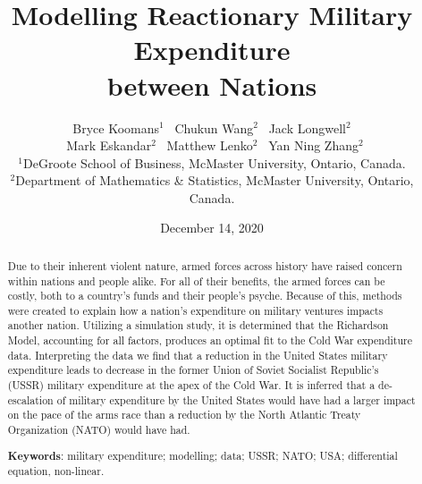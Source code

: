 \documentclass[12pt, centerh1]{article}
\title{Modelling Reactionary Military Expenditure \\between Nations}
\author{\qquad Bryce Koomans$^{1}$ \qquad\  Chukun Wang$^{2}$ \qquad\  Jack Longwell$^{2}$ \\ 
        \qquad\ Mark Eskandar$^{2}$ \qquad\ Matthew Lenko$^{2}$ \qquad\  Yan Ning Zhang$^{2}$ \\
\small $^1$DeGroote School of Business, McMaster University, Ontario, Canada.\\[-6pt]
\small $^2$Department of Mathematics \& Statistics, McMaster University, Ontario, Canada.\\[-6pt] 
}
\date{{\small December 14, 2020}}
\begin{document}
\maketitle
\begin{abstract}

Due to their inherent violent nature, armed forces across history have raised concern within nations and people alike. For all of their benefits, the armed forces can be costly, both to a country's funds and their people's psyche. Because of this, methods were created to explain how a nation's expenditure on military ventures impacts another nation. Utilizing a simulation study, it is determined that the Richardson Model, accounting for all factors, produces an optimal fit to the Cold War expenditure data. Interpreting the data we find that a reduction in the United States military expenditure leads to decrease in the former Union of Soviet Socialist Republic's (USSR) military expenditure at the apex of the Cold War. It is inferred that a de-escalation of military expenditure by the United States would have had a larger impact on the pace of the arms race than a reduction by the North Atlantic Treaty Organization (NATO) would have had. 

\vspace{3mm}

\noindent\textbf{Keywords}: military expenditure; modelling; data; USSR; NATO; USA; differential equation, non-linear.
\end{abstract}

\end{document}
